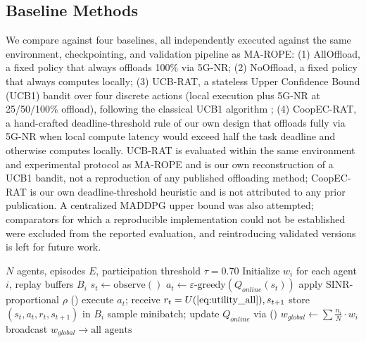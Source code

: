 \documentclass[journal,10pt,twocolumn]{IEEEtran}
\begin{document}
\subsection{Baseline Methods}

We compare against four baselines, all independently executed against the same environment, checkpointing, and validation pipeline as MA-ROPE: (1) AllOffload, a fixed policy that always offloads 100\% via 5G-NR; (2) NoOffload, a fixed policy that always computes locally; (3) UCB-RAT, a stateless Upper Confidence Bound (UCB1) bandit over four discrete actions (local execution plus 5G-NR at 25/50/100\% offload), following the classical UCB1 algorithm \cite{auer2002}; (4) CoopEC-RAT, a hand-crafted deadline-threshold rule of our own design that offloads fully via 5G-NR when local compute latency would exceed half the task deadline and otherwise computes locally. UCB-RAT is evaluated within the same environment and experimental protocol as MA-ROPE and is our own reconstruction of a UCB1 bandit, not a reproduction of any published offloading method; CoopEC-RAT is our own deadline-threshold heuristic and is not attributed to any prior publication. A centralized MADDPG \cite{lowe2017} upper bound was also attempted; comparators for which a reproducible implementation could not be established were excluded from the reported evaluation, and reintroducing validated versions is left for future work.



\begin{algorithm}[t]
\caption{MA-ROPE Training with FedAvg}
\label{alg:ma_rope}
\begin{algorithmic}[1]
\REQUIRE $N$ agents, episodes $E$, participation threshold $\tau=0.70$
\STATE Initialize $w_i$ for each agent $i$, replay buffers $B_i$
        \STATE $s_t \leftarrow \text{observe}()$ 
        \STATE $a_t \leftarrow \varepsilon\text{-greedy}(Q_{online}(s_t))$
        \STATE apply SINR-proportional $\rho$ ()
        \STATE execute $a_t$; receive $r_t = U (\text{\Cref{eq:utility_all}}), s_{t+1}$
        \STATE store $(s_t, a_t, r_t, s_{t+1})$ in $B_i$
        \STATE sample minibatch; update $Q_{online}$ via ()
    \ENDFOR
        \STATE $w_{global} \leftarrow \sum \frac{n_i}{N} \cdot w_i$ 
        \STATE broadcast $w_{global} \rightarrow \text{all agents}$
    \ENDIF
\ENDFOR
\end{algorithmic}
\end{algorithm}
\end{document}
